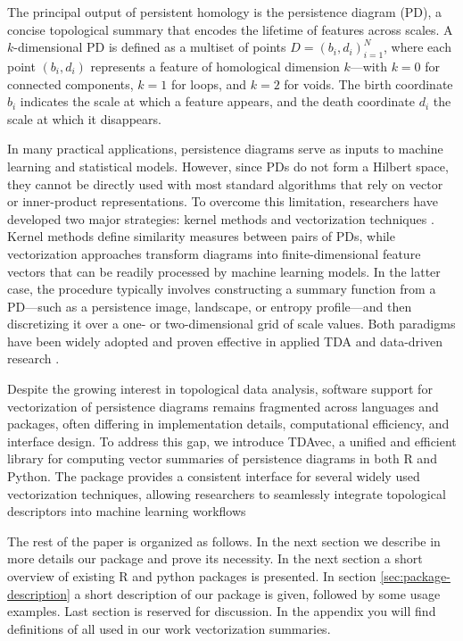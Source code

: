 \documentclass[conference, onecolumn]{IEEEtran}
\begin{document}
The principal output of persistent homology is the persistence diagram (PD), a concise topological summary that encodes the lifetime of features across scales. A $k$-dimensional PD is defined as a multiset of points $D={(b_i,d_i)}_{i=1}^N$, where each point $(b_i,d_i)$ represents a feature of homological dimension $k$—with $k=0$ for connected components, $k=1$ for loops, and $k=2$ for voids. The birth coordinate $b_i$ indicates the scale at which a feature appears, and the death coordinate $d_i$ the scale at which it disappears.

In many practical applications, persistence diagrams serve as inputs to machine learning and statistical models. However, since PDs do not form a Hilbert space, they cannot be directly used with most standard algorithms that rely on vector or inner-product representations. To overcome this limitation, researchers have developed two major strategies: kernel methods and vectorization techniques \cite{chung2022persistence}. Kernel methods define similarity measures between pairs of PDs, while vectorization approaches transform diagrams into finite-dimensional feature vectors that can be readily processed by machine learning models. In the latter case, the procedure typically involves constructing a summary function from a PD—such as a persistence image, landscape, or entropy profile—and then discretizing it over a one- or two-dimensional grid of scale values. Both paradigms have been widely adopted and proven effective in applied TDA and data-driven research \cite{hensel2021survey}.

Despite the growing interest in topological data analysis, software support for vectorization of persistence diagrams remains fragmented across languages and packages, often differing in implementation details, computational efficiency, and interface design. To address this gap, we introduce TDAvec, a unified and efficient library for computing vector summaries of persistence diagrams in both R and Python. The package provides a consistent interface for several widely used vectorization techniques, allowing researchers to seamlessly integrate topological descriptors into machine learning workflows

The rest of the paper is organized as follows. In the next section we describe in more details our package and prove its necessity. In the next section a short overview of existing R and python packages is presented. In section \ref{sec:package-description} a short description of our package is given, followed by some usage examples. Last section is reserved for discussion. In the appendix you will find definitions of all used in our work vectorization summaries.
\end{document}
